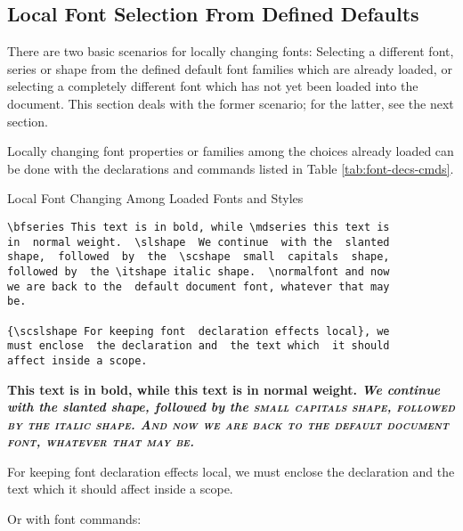 \documentclass[a4paper,oneside,11pt]{article}
\begin{document}
\subsection{Local Font Selection From Defined Defaults}
\label{subsec:fontsel:local:defaults}

There  are  two  basic  scenarios  for  locally  changing  fonts: Selecting  a
different font, series  or shape from the defined default  font families which
are already loaded, or selecting a completely different font which has not yet
been loaded  into the document. This  section deals with the  former scenario;
for the latter, see the next section.

Locally  changing  font  properties  or families  among  the  choices  already
loaded  can  be done  with  the  declarations  and  commands listed  in  Table
\ref{tab:font-decs-cmds}.


\begin{titled-frame}
{\textsf{Local Font Changing Among Loaded Fonts and Styles}}
\vspace{-1em}
\begin{verbatim}
\bfseries This text is in bold, while \mdseries this text is
in  normal weight.  \slshape  We continue  with the  slanted
shape,  followed  by  the  \scshape  small  capitals  shape,
followed by  the \itshape italic shape.  \normalfont and now
we are back to the  default document font, whatever that may
be.

{\scslshape For keeping font  declaration effects local}, we
must enclose  the declaration and  the text which  it should
affect inside a scope.
\end{verbatim}
\bfseries This text is in bold, while \mdseries this text is
in  normal weight.  \slshape  We continue  with the  slanted
shape,  followed  by  the  \scshape  small  capitals  shape,
followed by  the \itshape italic shape.  \normalfont And now
we are back to the  default document font, whatever that may
be.

{\scslshape For keeping font  declaration effects local}, we
must enclose  the declaration and  the text which  it should
affect inside a scope.
\end{titled-frame}

Or with font commands:
\end{document}
